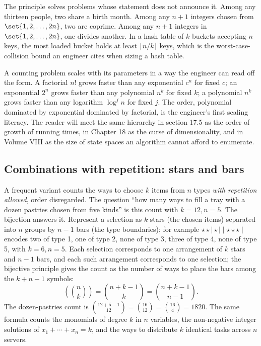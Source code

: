 The principle solves problems whose statement does not announce it.
Among any thirteen people, two share a birth month. Among any $n+1$
integers chosen from $\set{1, 2, \ldots, 2n}$, two are coprime.
Among any $n+1$ integers in $\set{1, 2, \ldots, 2n}$, one divides
another. In a hash table of $k$ buckets accepting $n$ keys, the most
loaded bucket holds at least $\lceil n/k \rceil$ keys, which is the
worst-case-collision bound an engineer cites when sizing a hash
table.

\begin{archetype}[Scaling]
A counting problem scales with its parameters in a way the engineer
can read off the form. A factorial $n!$ grows faster than any
exponential $c^{n}$ for fixed $c$; an exponential $2^{n}$ grows
faster than any polynomial $n^{k}$ for fixed $k$; a polynomial
$n^{k}$ grows faster than any logarithm $\log^{j} n$ for fixed $j$.
The order, polynomial dominated by exponential dominated by
factorial, is the engineer's first scaling literacy. The reader
will meet the same hierarchy in section 17.5 as the order of growth
of running times, in Chapter 18 as the curse of dimensionality, and
in Volume VIII as the size of state spaces an algorithm cannot
afford to enumerate.
\end{archetype}

\subsection{Combinations with repetition: stars and bars}

A frequent variant counts the ways to choose $k$ items from $n$
types \emph{with repetition allowed}, order disregarded. The
question ``how many ways to fill a tray with a dozen pastries chosen
from five kinds'' is this count with $k = 12, n = 5$. The
 bijection answers it. Represent a selection
as $k$ stars (the chosen items) separated into $n$ groups by $n - 1$
bars (the type boundaries); for example $\star\star \mid \star \mid
\mid \star\star\star \mid$ encodes two of type 1, one of type 2,
none of type 3, three of type 4, none of type 5, with $k = 6, n =
5$. Each selection corresponds to one arrangement of $k$ stars and
$n - 1$ bars, and each such arrangement corresponds to one
selection; the bijective principle gives the count as the number of
ways to place the bars among the $k + n - 1$ symbols:
\[
\left(\!\!\binom{n}{k}\!\!\right) = \binom{n + k - 1}{k}
= \binom{n + k - 1}{n - 1}.
\]
The dozen-pastries count is $\binom{12 + 5 - 1}{12} = \binom{16}{12}
= \binom{16}{4} = 1820$. The same formula counts the monomials of
degree $k$ in $n$ variables, the non-negative integer solutions of
$x_{1} + \cdots + x_{n} = k$, and the ways to distribute $k$
identical tasks across $n$ servers.

